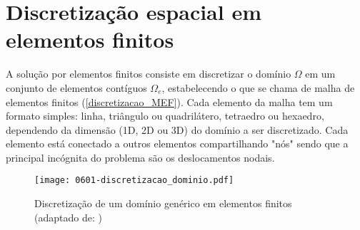 \section{Discretização espacial em elementos finitos}
\label{cap:Discretização espacial em elementos finitos}
A solução por elementos finitos consiste em discretizar o domínio $\Omega$ em um conjunto de elementos contíguos $\Omega_e$, estabelecendo o que se chama de malha de elementos finitos (\autoref{discretizacao_MEF}). Cada elemento da malha tem um formato simples: linha, triângulo ou quadrilátero, tetraedro ou hexaedro, dependendo da dimensão (1D, 2D ou 3D) do domínio a ser discretizado. Cada elemento está conectado a outros elementos compartilhando "nós" sendo que a principal incógnita do problema são os deslocamentos nodais.
\begin{figure}[H]
	\begin{center}
		\texttt{[image: 0601-discretizacao\_dominio.pdf]}
	\end{center}
	\caption{\label{discretizacao_MEF}Discretização de um domínio genérico em elementos finitos (adaptado de: )}
\end{figure}

